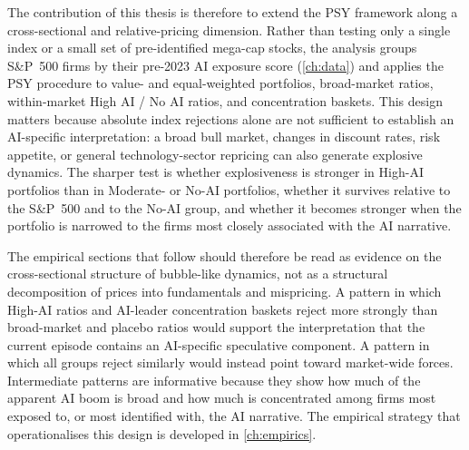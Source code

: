 The contribution of this thesis is therefore to extend the PSY framework along a cross-sectional and relative-pricing dimension. Rather than testing only a single index or a small set of pre-identified mega-cap stocks, the analysis groups S\&P~500 firms by their pre-2023 AI exposure score (\cref{ch:data}) and applies the PSY procedure to value- and equal-weighted portfolios, broad-market ratios, within-market High AI / No AI ratios, and concentration baskets. This design matters because absolute index rejections alone are not sufficient to establish an AI-specific interpretation: a broad bull market, changes in discount rates, risk appetite, or general technology-sector repricing can also generate explosive dynamics. The sharper test is whether explosiveness is stronger in High-AI portfolios than in Moderate- or No-AI portfolios, whether it survives relative to the S\&P~500 and to the No-AI group, and whether it becomes stronger when the portfolio is narrowed to the firms most closely associated with the AI narrative.

The empirical sections that follow should therefore be read as evidence on the cross-sectional structure of bubble-like dynamics, not as a structural decomposition of prices into fundamentals and mispricing. A pattern in which High-AI ratios and AI-leader concentration baskets reject more strongly than broad-market and placebo ratios would support the interpretation that the current episode contains an AI-specific speculative component. A pattern in which all groups reject similarly would instead point toward market-wide forces. Intermediate patterns are informative because they show how much of the apparent AI boom is broad and how much is concentrated among firms most exposed to, or most identified with, the AI narrative. The empirical strategy that operationalises this design is developed in \cref{ch:empirics}.
